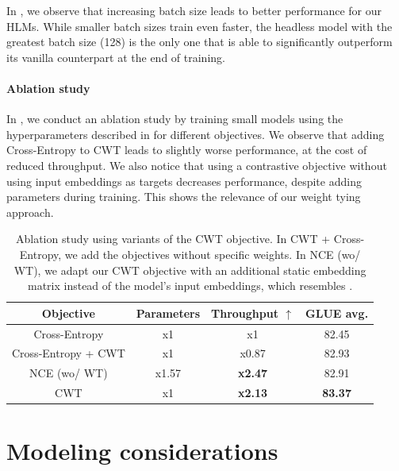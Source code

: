 In , we observe that increasing batch size  leads to better performance for our HLMs. While smaller batch sizes train even faster, the headless model with the greatest batch size (128) is the only one that is able to significantly outperform its vanilla counterpart at the end of training.

\paragraph{Ablation study}

In , we conduct an ablation study by training small models using the hyperparameters described in  for different objectives. We observe that adding Cross-Entropy to CWT leads to slightly worse performance, at the cost of reduced throughput. We also notice that using a contrastive objective without using input embeddings as targets decreases performance, despite adding parameters during training. This shows the relevance of our weight tying approach.

\begin{table}[h]
\centering \small
\begin{tabular}{@{}cccc@{}}
\toprule
Objective           & Parameters & Throughput $\uparrow$     & GLUE avg.      \\ \midrule
Cross-Entropy       & x1        & x1             & 82.45          \\
Cross-Entropy + CWT & x1        & x0.87          & 82.93          \\
NCE (wo/ WT)        & x1.57        & \textbf{x2.47} & 82.91          \\
CWT                 & x1        & \textbf{x2.13} & \textbf{83.37} \\ \bottomrule
\end{tabular}
\caption{Ablation study using variants of the CWT objective. In CWT + Cross-Entropy, we add the objectives without specific weights. In NCE (wo/ WT), we adapt our CWT objective with an additional static embedding matrix instead of the model's input embeddings, which resembles \citet{ma-collins-2018-noise}.}
\label{tab:ablation}
\end{table}

\section{Modeling considerations} 
